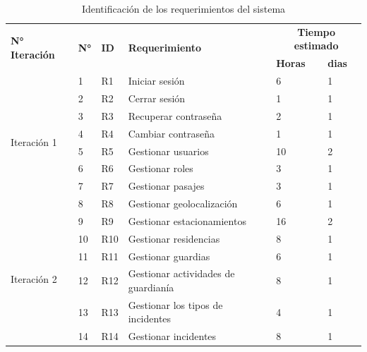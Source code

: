 \begin{spacing}{1}
    \begin{center}
        \renewcommand*{\arraystretch}{1.4}
        \begin{longtable}[l]{|p{}|p{}|p{}|p{}| p{}|p{}| }
            \caption{Identificación de los requerimientos del sistema} \\
            \hline
            \multirow{2}{*}{\textbf{N° Iteración}} & \multirow{2}{*}{\textbf{N°}} & \multirow{2}{*}{\textbf{ID}} & \multirow{2}{*}{\textbf{Requerimiento}} & \multicolumn{2}{c|}{\textbf{Tiempo estimado}}\\
            \cline{5-6}
            & & & & \textbf{Horas} & \textbf{dias} \\
            \hline
            \multirow{8}{*}{Iteración 1} & 1 & R1 & Iniciar sesión & 6 & 1 \\
            \cline{2-6}
             & 2 & R2 & Cerrar sesión & 1 & 1 \\
            \cline{2-6}
             & 3 & R3 & Recuperar contraseña & 2 & 1 \\
            \cline{2-6}
             & 4 & R4 & Cambiar contraseña & 1 & 1 \\
            \cline{2-6}
             & 5 & R5 & Gestionar usuarios & 10 & 2 \\
            \cline{2-6}
             & 6 & R6 & Gestionar roles & 3 & 1 \\
            \cline{2-6}
             & 7 & R7 & Gestionar pasajes & 3 & 1 \\
            \cline{2-6}
             & 8 & R8 & Gestionar geolocalización & 6 & 1 \\
            \hline
            \multirow{9}{*}{Iteración 2} & 9 & R9 & Gestionar estacionamientos & 16 & 2 \\
            \cline{2-6}
             & 10 & R10 & Gestionar residencias & 8 & 1 \\
            \cline{2-6}
             & 11 & R11 & Gestionar guardias & 6 & 1 \\
            \cline{2-6}
             & 12 & R12 & Gestionar actividades de guardianía & 8 & 1 \\
            \cline{2-6}
             & 13 & R13 & Gestionar los tipos de incidentes & 4 & 1 \\
            \hline
             & 14 & R14 & Gestionar incidentes & 8 & 1 \\
            \cline{2-6}

\end{longtable}
\end{center}
\end{spacing}
